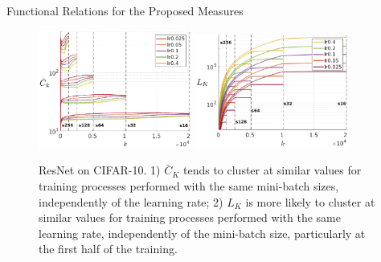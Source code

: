 \documentclass{beamer}
\begin{document}
\begin{frame}{Functional Relations for the Proposed Measures}
    \begin{figure}
        \centering
        \includegraphics[width=0.45\textwidth]{figs/AVG_C_K_vs_iter.png}
        \includegraphics[width=0.45\textwidth]{figs/L_K_vs_iter.png}
        \caption{ResNet on CIFAR-10. 1) $\bar C_K$ tends to cluster at similar values for training processes performed with the same mini-batch sizes, independently of the learning rate; 2) $L_K$ is more likely to cluster at similar values for training processes performed with the same learning rate, independently of the mini-batch size, particularly at the first half of the training.}
        \label{fig:batch-lr}
    \end{figure}
\end{frame}
\end{document}

